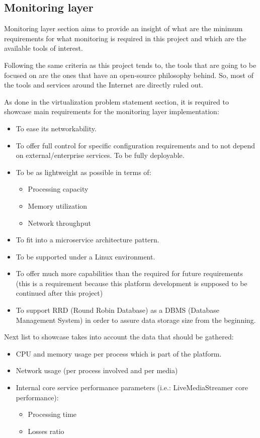 \subsection{Monitoring layer}

Monitoring layer section aims to provide an insight of what are the minimum requirements for what monitoring is required in this project and which are the available tools of interest.

Following the same criteria as this project tends to, the tools that are going to be focused on are the ones that have an open-source philosophy behind. So, most of the tools and services around the Internet are directly ruled out.

As done in the virtualization problem statement section, it is required to showcase main requirements for the monitoring layer implementation:

\begin{itemize}
\item To ease its networkability.
\item To offer full control for specific configuration requirements and to not depend on external/enterprise services. To be fully deployable.
\item To be as lightweight as possible in terms of:
\begin{itemize}
\item Processing capacity
\item Memory utilization
\item Network throughput
\end{itemize}
\item To fit into a microservice architecture pattern.
\item To be supported under a Linux environment.
\item To offer much more capabilities than the required for future requirements (this is a requirement because this platform development is supposed to be continued after this project)
\item To support RRD (Round Robin Database) as a DBMS (Database Management System) in order to assure data storage size from the beginning.
\end{itemize}

Next list to showcase takes into account the data that should be gathered:

\begin{itemize}
\item CPU and memory usage per process which is part of the platform.
\item Network usage (per process involved and per media)
\item Internal core service performance parameters (i.e.: LiveMediaStreamer core performance):
\begin{itemize}
\item Processing time
\item Losses ratio
\end{itemize}
\end{itemize}

